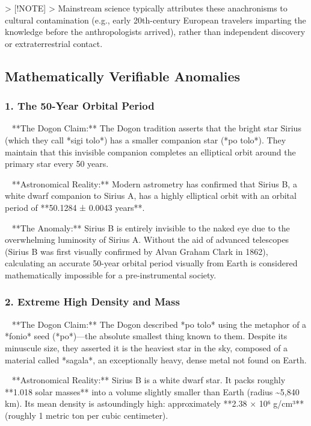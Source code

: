 \documentclass[aps,prd,11pt,onecolumn,superscriptaddress,nofootinbib,floatfix]{revtex4-2}
\begin{document}
> [!NOTE]
> Mainstream science typically attributes these anachronisms to cultural contamination (e.g., early 20th-century European travelers imparting the knowledge before the anthropologists arrived), rather than independent discovery or extraterrestrial contact.


\subsection{Mathematically Verifiable Anomalies}


\subsubsection{1. The 50-Year Orbital Period}


\textbullet~  **The Dogon Claim:** The Dogon tradition asserts that the bright star Sirius (which they call *sigi tolo*) has a smaller companion star (*po tolo*). They maintain that this invisible companion completes an elliptical orbit around the primary star every 50 years.

\textbullet~  **Astronomical Reality:** Modern astrometry has confirmed that Sirius B, a white dwarf companion to Sirius A, has a highly elliptical orbit with an orbital period of **50.1284 ± 0.0043 years**.

\textbullet~  **The Anomaly:** Sirius B is entirely invisible to the naked eye due to the overwhelming luminosity of Sirius A. Without the aid of advanced telescopes (Sirius B was first visually confirmed by Alvan Graham Clark in 1862), calculating an accurate 50-year orbital period visually from Earth is considered mathematically impossible for a pre-instrumental society.



\subsubsection{2. Extreme High Density and Mass}


\textbullet~  **The Dogon Claim:** The Dogon described *po tolo* using the metaphor of a *fonio* seed (*po*)---the absolute smallest thing known to them. Despite its minuscule size, they asserted it is the heaviest star in the sky, composed of a material called *sagala*, an exceptionally heavy, dense metal not found on Earth.

\textbullet~  **Astronomical Reality:** Sirius B is a white dwarf star. It packs roughly **1.018 solar masses** into a volume slightly smaller than Earth (radius \textasciitilde{}5,840 km). Its mean density is astoundingly high: approximately **2.38 × 10⁶ g/cm³** (roughly 1 metric ton per cubic centimeter).
\end{document}
